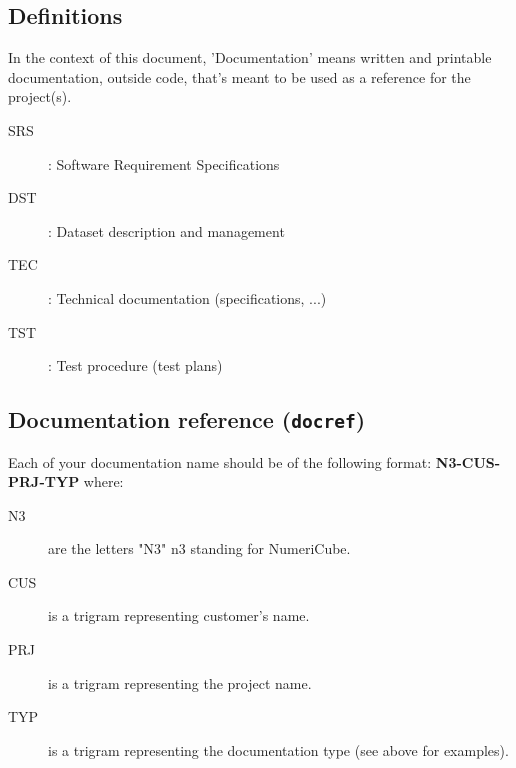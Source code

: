 

\subsection{Definitions}

In the context of this document, 'Documentation' means written and printable documentation,
outside code, that's meant to be used as a reference for the project(s).

\begin{description}
    \item[SRS]: Software Requirement Specifications
    \item[DST]: Dataset description and management
    \item[TEC]: Technical documentation (specifications, ...)
    \item[TST]: Test procedure (test plans)
\end{description}

\subsection{Documentation reference (\texttt{docref})}

Each of your documentation name should be of the following format: \textbf{N3-CUS-PRJ-TYP} where:

\begin{description}
    \item[N3] are the letters "N3" \gls{n3} standing for NumeriCube.
    \item[CUS] is a trigram representing customer's name.
    \item[PRJ] is a trigram representing the project name.
    \item[TYP] is a trigram representing the documentation type (see above for examples).
\end{description}

